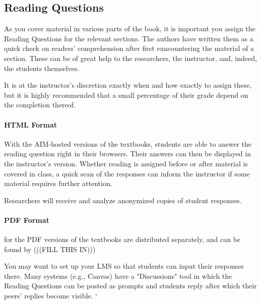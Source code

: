 \documentclass[10pt,]{article}
\begin{document}
\subsection[{Reading Questions}]{Reading Questions}\label{subsection-reading-questions}
\hypertarget{p-43}{}%
As you cover material in various parts of the book, it is important you assign the Reading Questions for the relevant sections. The authors have written them as a quick check on readers' comprehension after first exncountering the material of a section. These can be of great help to the researchers, the instructor, and, indeed, the students themselves.%
\par
\hypertarget{p-44}{}%
It is at the instructor's discretion exactly when and how exactly to assign these, but it is highly recommended that a small percentage of their grade depend on the completion thereof.%
\typeout{************************************************}
\typeout{************************************************}
\paragraph[{HTML Format}]{HTML Format}\hypertarget{paragraphs-21}{}
\hypertarget{p-45}{}%
With the AIM-hosted versions of the textbooks, students are able to answer the reading question right in their browsers. Their answers can then be displayed in the instructor's version. Whether reading is assigned before or after material is covered in class, a quick scan of the responses can inform the instructor if some material requires further attention.%
\par
\hypertarget{p-46}{}%
Researchers will receive and analyze anonymized copies of student responses.%
\typeout{************************************************}
\typeout{************************************************}
\paragraph[{PDF Format}]{PDF Format}\hypertarget{paragraphs-22}{}
\hypertarget{p-47}{}%
for the PDF versions of the textbooks are distributed separately, and can be found by (((FILL THIS IN)))%
\par
\hypertarget{p-48}{}%
You may want to set up your LMS so that students can input their responses there. Many systems (e.g., Canvas) have a "Discussions" tool in which the Reading Questions can be posted as prompts and students reply after which their peers' replies become visible.%
 `
\end{document}

